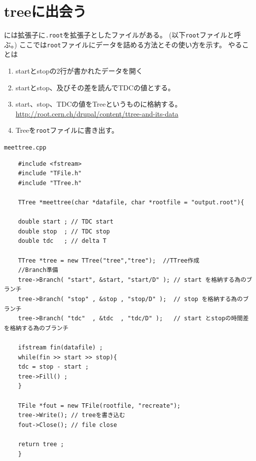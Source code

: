
 \clearpage
 \section{treeに出会う}

 \ROOT には拡張子に\verb|.root|を拡張子としたファイルがある。
 (以下\verb|root|ファイルと呼ぶ。)
 ここでは\verb|root|ファイルにデータを詰める方法とその使い方を示す。
 やることは
 \begin{enumerate}
  \item startとstopの2行が書かれたデータを開く
  \item startとstop、及びその差を読んでTDCの値とする。
  \item start、stop、TDCの値をTreeというものに格納する。\\
	\url{http://root.cern.ch/drupal/content/ttree-and-its-data}
  \item Treeを\verb|root|ファイルに書き出す。
 \end{enumerate}

 \begin{itembox}{\texttt{meettree.cpp}}
\begin{verbatim}
	#include <fstream>
	#include "TFile.h"
	#include "TTree.h"

	TTree *meettree(char *datafile, char *rootfile = "output.root"){

	double start ; // TDC start
	double stop  ; // TDC stop
	double tdc   ; // delta T

	TTree *tree = new TTree("tree","tree");  //TTree作成
	//Branch準備
	tree->Branch( "start", &start, "start/D" ); // start を格納する為のブランチ
	tree->Branch( "stop" , &stop , "stop/D" );  // stop を格納する為のブランチ
	tree->Branch( "tdc"  , &tdc  , "tdc/D" );   // start とstopの時間差 を格納する為のブランチ

	ifstream fin(datafile) ;
	while(fin >> start >> stop){
	tdc = stop - start ;
	tree->Fill() ;
	}

	TFile *fout = new TFile(rootfile, "recreate");
	tree->Write(); // treeを書き込む
	fout->Close(); // file close

	return tree ;
	}
\end{verbatim}
 \end{itembox}

